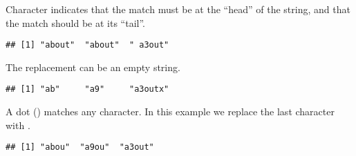 \documentclass[krantz2]{krantz}\usepackage{knitr}
\begin{document}
Character \code{\textasciicircum} indicates that the match must be at the ``head'' of the string, and \code{\$} that the match should be at its ``tail''.

\begin{knitrout}\footnotesize
{}\color{fgcolor}\begin{kframe}
\begin{alltt}
\hlstd{(} \hlstd{=} \hlstd{,}
      \hlstd{=} \hlstd{,}
      \hlstd{=} \hlstd{(}\hlstd{,} \hlstd{,} \hlstd{))}
\end{alltt}
\begin{verbatim}
## [1] "about"  "about"  " a3out"
\end{verbatim}
\end{kframe}
\end{knitrout}

The replacement can be an empty string.

\begin{knitrout}\footnotesize
{}\color{fgcolor}\begin{kframe}
\begin{alltt}
\hlstd{(} \hlstd{=} \hlstd{,}
      \hlstd{=} \hlstd{,}
      \hlstd{=} \hlstd{(}\hlstd{,} \hlstd{,} \hlstd{))}
\end{alltt}
\begin{verbatim}
## [1] "ab"     "a9"     "a3outx"
\end{verbatim}
\end{kframe}
\end{knitrout}

A dot () matches any character. In this example we replace the last character with .

\begin{knitrout}\footnotesize
{}\color{fgcolor}\begin{kframe}
\begin{alltt}
\hlstd{(} \hlstd{=} \hlstd{,}
      \hlstd{=} \hlstd{,}
      \hlstd{=} \hlstd{(}\hlstd{,} \hlstd{,} \hlstd{))}
\end{alltt}
\begin{verbatim}
## [1] "abou"  "a9ou"  "a3out"
\end{verbatim}
\end{kframe}
\end{knitrout}
\end{document}
